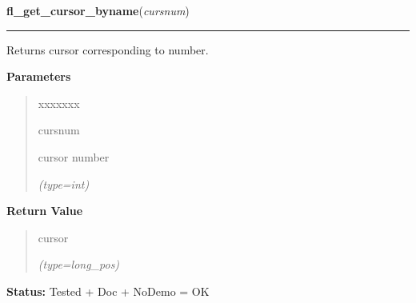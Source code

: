    \label{xformslib:flcursor:fl_get_cursor_byname}

    \vspace{0.5ex}

\hspace{.8\funcindent}\begin{boxedminipage}{\funcwidth}

    \raggedright \textbf{fl\_get\_cursor\_byname}(\textit{cursnum})

    \vspace{-1.5ex}

    \rule{\textwidth}{0.5\fboxrule}
\setlength{\parskip}{2ex}
    Returns cursor corresponding to number.

\setlength{\parskip}{1ex}
      \textbf{Parameters}
      \vspace{-1ex}

      \begin{quote}
        \begin{Ventry}{xxxxxxx}

          \item[cursnum]

          cursor number

            {\it (type=int)}

        \end{Ventry}

      \end{quote}

      \textbf{Return Value}
    \vspace{-1ex}

      \begin{quote}
      cursor

      {\it (type=long\_pos)}

      \end{quote}

\textbf{Status:} Tested + Doc + NoDemo = OK



    \end{boxedminipage}

    \label{xformslib:flcursor:fl_reset_cursor}

    \vspace{0.5ex}

